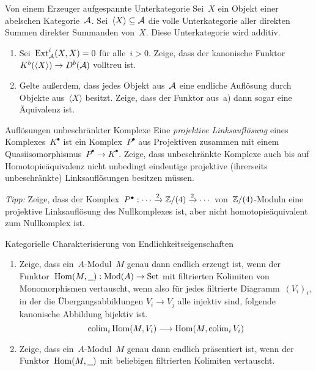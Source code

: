 \documentclass{uebblatt}
\begin{document}

\begin{aufgabe}{Von einem Erzeuger aufgespannte Unterkategorie}
Sei~$X$ ein Objekt einer abelschen Kategorie~$\mathcal{A}$. Sei~$\langle X \rangle
\subseteq \mathcal{A}$ die volle Unterkategorie aller direkten Summen direkter Summanden
von~$X$. Diese Unterkategorie wird additiv.
\begin{enumerate}
\item Sei~$\mathrm{Ext}_{\mathcal{A}}^i(X,X) = 0$ für alle~$i > 0$. Zeige, dass der kanonische
Funktor~$K^b(\langle X \rangle) \to D^b(\mathcal{A})$ volltreu ist.
\item Gelte außerdem, dass jedes Objekt aus~$\mathcal{A}$ eine endliche Auflösung durch Objekte
aus~$\langle X \rangle$ besitzt. Zeige, dass der Funktor aus~a) dann sogar eine
Äquivalenz ist.
\end{enumerate}
\end{aufgabe}

\begin{aufgabe}{Auflösungen unbeschränkter Komplexe}
Eine \emph{projektive Linksauflösung} eines Komplexes~$K^\bullet$ ist ein
Komplex~$P^\bullet$ aus Projektiven zusammen mit einem
Quasiisomorphismus~$P^\bullet \to K^\bullet$. Zeige, dass unbeschränkte
Komplexe auch bis auf Homotopieäquivalenz nicht unbedingt eindeutige projektive
(ihrerseits unbeschränkte) Linksauflösungen besitzen müssen.

{\tiny\emph{Tipp:} Zeige, dass der Komplex~$P^\bullet : \cdots \xrightarrow{2} \mathbb{Z}/(4)
\xrightarrow{2} \cdots$ von~$\mathbb{Z}/(4)$-Moduln eine projektive Linksauflösung des
Nullkomplexes ist, aber nicht homotopieäquivalent zum Nullkomplex ist.\par}
\end{aufgabe}

\begin{aufgabe}{Kategorielle Charakterisierung von Endlichkeitseigenschaften}
\begin{enumerate}
\item Zeige, dass ein~$A$-Modul~$M$ genau dann endlich erzeugt ist, wenn der
Funktor~$\mathrm{Hom}(M,\underline{\ \ }) : \mathrm{Mod}(A) \to \mathrm{Set}$ mit filtrierten
Kolimiten von Monomorphismen vertauscht, wenn also für jedes filtrierte
Diagramm~$(V_i)_i$, in der die Übergangsabbildungen $V_i \to V_j$ alle injektiv
sind, folgende kanonische Abbildung bijektiv ist.
\[ \operatorname{colim}_i \mathrm{Hom}(M,V_i) \longrightarrow \mathrm{Hom}(M, \operatorname{colim}_i V_i) \]
\item Zeige, dass ein~$A$-Modul~$M$ genau dann endlich präsentiert ist, wenn
der Funktor~$\mathrm{Hom}(M,\underline{\ \ })$ mit beliebigen filtrierten Kolimiten
vertauscht.
\end{enumerate}
\end{aufgabe}
\end{document}
